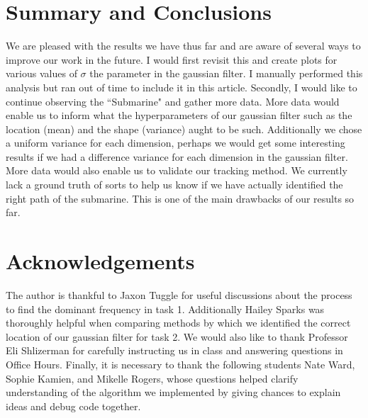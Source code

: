 \documentclass[11pt]{amsart}
\begin{document}
\section{Summary and Conclusions}\label{sec:conclusions}
We are pleased with the results we have thus far and are aware of several ways to improve our work in the future.
I would first revisit this and create plots for various values of $\sigma$ the parameter in the gaussian filter.
I manually performed this analysis but ran out of time to include it in this article.
Secondly, I would like to continue observing the ``Submarine" and gather more data.
More data would enable us to inform what the hyperparameters of our gaussian filter such as the location (mean) and the shape (variance) aught to be such.
Additionally we chose a uniform variance for each dimension, perhaps we would get some interesting results if we had a difference variance for each dimension in the gaussian filter.
More data would also enable us to validate our tracking method.
We currently lack a ground truth of sorts to help us know if we have actually identified the right path of the submarine.
This is one of the main drawbacks of our results so far.

\section*{Acknowledgements} 

The author is thankful to Jaxon Tuggle for useful discussions about the process to find the dominant frequency in task 1. 
Additionally Hailey Sparks was thoroughly helpful when comparing methods by which we identified the correct location of our gaussian filter for task 2.
We would also like to thank Professor Eli Shlizerman for carefully instructing us in class and answering questions in Office Hours.
Finally, it is necessary to thank the following students Nate Ward, Sophie Kamien, and Mikelle Rogers, whose questions helped clarify understanding of the algorithm we implemented by giving chances to explain ideas and debug code together.


\end{document}
